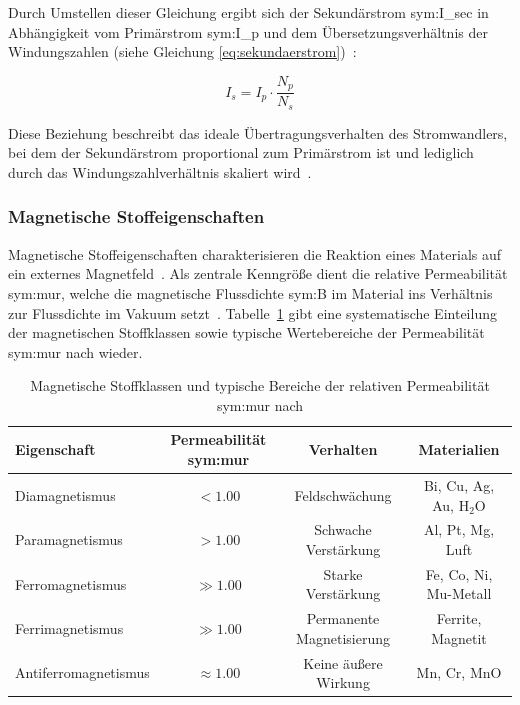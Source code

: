 Durch Umstellen dieser Gleichung ergibt sich der Sekundärstrom \gls{sym:I_sec} in Abhängigkeit vom Primärstrom \gls{sym:I_p} und dem Übersetzungsverhältnis der Windungszahlen (siehe Gleichung \eqref{eq:sekundaerstrom})~\cite[S.~63]{book-Technologie_Messwandler-Minkner}:

\begin{equation}
    I_{s} = I_{p} \cdot \frac{N_{p}}{N_{s}}
    \label{eq:sekundaerstrom}
\end{equation}

Diese Beziehung beschreibt das ideale Übertragungsverhalten des Stromwandlers, bei dem der Sekundärstrom proportional zum Primärstrom ist und lediglich durch das Windungszahlverhältnis skaliert wird~\cite[S.~63]{book-Technologie_Messwandler-Minkner}.


\subsubsection{Magnetische Stoffeigenschaften}
\label{sec:magnetische_stoffeigenschaften}

Magnetische Stoffeigenschaften charakterisieren die Reaktion eines Materials auf ein externes Magnetfeld~\cite[Kap.~11]{book-Magnetisches_Feld_Moeller-Harriehausen}. Als zentrale Kenngröße dient die relative Permeabilität \gls{sym:mur}, welche die magnetische Flussdichte \gls{sym:B} im Material ins Verhältnis zur Flussdichte im Vakuum setzt~\cite[Tab.~48]{book-Taschenbuch_Physik-Kuchling}. Tabelle~\ref{tab:magnetische_stoffeigenschaften} gibt eine systematische Einteilung der magnetischen Stoffklassen sowie typische Wertebereiche der Permeabilität \gls{sym:mur} nach \cite[Tab.~48]{book-Taschenbuch_Physik-Kuchling} wieder.

\begin{table}[H]
    \centering
    \caption{Magnetische Stoffklassen und typische Bereiche der relativen Permeabilität \gls{sym:mur} nach \cite[Tab.~48]{book-Taschenbuch_Physik-Kuchling}}
    \label{tab:magnetische_stoffeigenschaften}
    \begin{tabular}{lccc}
        \toprule
        \textbf{Eigenschaft} & \textbf{Permeabilität \gls{sym:mur}} & \textbf{Verhalten}        & \textbf{Materialien}   \\ 
        \midrule
        Diamagnetismus       & $< \num{1,00}$                       & Feldschwächung            & Bi, Cu, Ag, Au, $\text{H}_2\text{O}$ \\
        Paramagnetismus      & $> \num{1,00}$                       & Schwache Verstärkung      & Al, Pt, Mg, Luft       \\
        Ferromagnetismus     & $\gg \num{1,00}$                     & Starke Verstärkung        & Fe, Co, Ni, Mu-Metall  \\
        Ferrimagnetismus     & $\gg \num{1,00}$                     & Permanente Magnetisierung & Ferrite, Magnetit      \\
        Antiferromagnetismus & $\approx \num{1,00}$                 & Keine äußere Wirkung      & Mn, Cr, MnO            \\
        \bottomrule
    \end{tabular}
\end{table}


